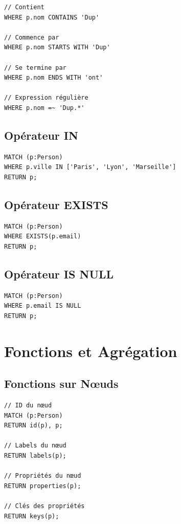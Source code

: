 \documentclass[11pt,a4paper]{article}
\begin{document}
\begin{lstlisting}
// Contient
WHERE p.nom CONTAINS 'Dup'

// Commence par
WHERE p.nom STARTS WITH 'Dup'

// Se termine par
WHERE p.nom ENDS WITH 'ont'

// Expression régulière
WHERE p.nom =~ 'Dup.*'
\end{lstlisting}

\subsection{Opérateur IN}

\begin{lstlisting}
MATCH (p:Person)
WHERE p.ville IN ['Paris', 'Lyon', 'Marseille']
RETURN p;
\end{lstlisting}

\subsection{Opérateur EXISTS}

\begin{lstlisting}
MATCH (p:Person)
WHERE EXISTS(p.email)
RETURN p;
\end{lstlisting}

\subsection{Opérateur IS NULL}

\begin{lstlisting}
MATCH (p:Person)
WHERE p.email IS NULL
RETURN p;
\end{lstlisting}

\newpage

\section{Fonctions et Agrégation}

\subsection{Fonctions sur Nœuds}

\begin{lstlisting}
// ID du nœud
MATCH (p:Person)
RETURN id(p), p;

// Labels du nœud
RETURN labels(p);

// Propriétés du nœud
RETURN properties(p);

// Clés des propriétés
RETURN keys(p);
\end{lstlisting}
\end{document}
